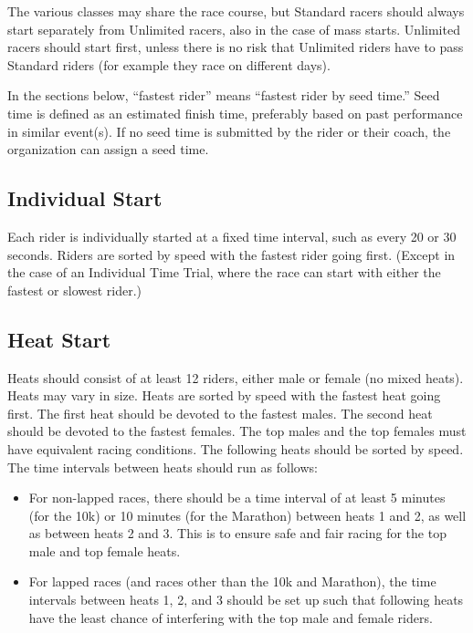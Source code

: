 The various classes may share the race course, but Standard racers should always start separately from Unlimited racers, also in the case of mass starts.
Unlimited racers should start first, unless there is no risk that Unlimited riders have to pass Standard riders (for example they race on different days).

In the sections below, ``fastest rider'' means ``fastest rider by seed time.'' Seed time is defined as an estimated finish time, preferably based on past performance in similar event(s).
If no seed time is submitted by the rider or their coach, the organization can assign a seed time.

\subsection{Individual Start \label{subsec:road_heat-assignment_individual-start}}

Each rider is individually started at a fixed time interval, such as every 20 or 30 seconds.
Riders are sorted by speed with the fastest rider going first.
(Except in the case of an Individual Time Trial, where the race can start with either the fastest or slowest rider.)

\subsection{Heat Start \label{subsec:road_heat-assignment_heat-start}}

Heats should consist of at least 12 riders, either male or female (no mixed heats).
Heats may vary in size.
Heats are sorted by speed with the fastest heat going first.
The first heat should be devoted to the fastest males.
The second heat should be devoted to the fastest females.
The top males and the top females must have equivalent racing conditions.
The following heats should be sorted by speed.
The time intervals between heats should run as follows:
\begin{itemize}
\item For non-lapped races, there should be a time interval of at least 5 minutes (for the 10k) or 10 minutes (for the Marathon) between heats 1 and 2, as well as between heats 2 and 3.
  This is to ensure safe and fair racing for the top male and top female heats.
\item For lapped races (and races other than the 10k and Marathon), the time intervals between heats 1, 2, and 3 should be set up such that following heats have the least chance of interfering with the top male and female riders.
\end{itemize}

